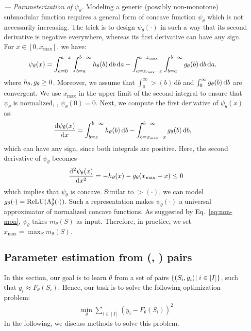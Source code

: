 \documentclass{article}
\newcommand{\ehdr}[1]{\noindent\emph{#1.}}
\def\d{\mathrm{d}}
\begin{document}
\ehdr{--- Parameterization of $\psi_{\theta}$} Modeling a  generic (possibly non-monotone) submodular function requires a general form of concave function $\psi_{\theta}$ which is not necessarily increasing.  The trick is to design $\psi_{\theta}(\cdot)$ in such a way that  its second derivative is negative everywhere, whereas its first derivative can have any sign. 
For $x \in [0,x_{\max}]$, we have:
\begin{align}
 \psi_{\theta}(x)&  = \int_{a=0} ^{a=x} \int_{b=a} ^{b=\infty} \gt(b) \, \d b \, \d a    - \int_{a=x_{\max}-x} ^{a=x_{\max}} \int_{b=a} ^{b=\infty}  \ggt(b) \, \d b \, \d a, \label{eq:psim}
\end{align}
where $h_{\theta}, g_{\theta} \ge 0$. Moreover, we assume that $\int_0^\infty \gt (b)\, \d b$ and $\int_0^\infty \ggt  (b)\, \d b$    are convergent.
We use $x_{\max}$ in the upper limit of the second integral to ensure
that $\psi_{\theta}$ is normalized, \ie, $\psi_{\theta}(0)=0$.
Next, we compute the first derivative of $\psi_{\theta}(x)$ as:
\begin{align}
    \frac{\d \psi_{\theta}(x)}{\d x} &=
    \int_{b=x}^ {b=\infty} \gt(b) \, \d b   - \int_{b=x_{\max }-x} ^{b=\infty} \ggt(b) \, \d b,
\end{align}
which can have any sign, since both integrals are positive. Here, the second derivative of $\psi_{\theta}$ becomes
\begin{align}
    \frac{\d^2\psi_{\theta}(x)}{\d x^2} = -  \gt(x) -  \ggt(x_{\max}-x)  \le 0 \label{eq:psimx}
\end{align}
which implies that $\psi_{\theta}$ is concave. 
%
Similar to $\gt(\cdot)$, we can model  $g_{\theta}(\cdot) = \text{ReLU}(\Lambda^{g} _{\theta} (\cdot))$. Such a representation makes $\psi_{\theta}(\cdot)$   a universal approximator of normalized concave functions. As suggested by Eq.~\eqref{eq:non-mon}, $\psi_{\theta}$ takes $m_{\theta}(S)$ as input. Therefore, in practice, we set
$x_{\max} = \max_S m_{\theta}(S)$.
 
\subsection{Parameter estimation from (\tset, \tvalue) pairs}
\label{sec:sec:train}
In this section, our goal is to learn
$\theta$ from a set of pairs $\left\{ (S_i,y_i)\,|\, i\in [I]\right\}$,  such that $y_i\approx F_{\theta}(S_i)$. Hence, our task is to solve the following optimization problem:
\begin{align}
\label{eq:loss}
\textstyle \min_{\theta} \sum_{i\in[I]}(y_i-F_{\theta}(S_i))^2
\end{align}
In the following, we discuss methods to solve this problem.
\end{document}
